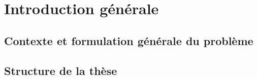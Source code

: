 
\chapter{Introduction g\'en\'erale}

\section{Contexte et formulation g\'en\'erale du probl\`eme}
\section{Structure de la th\`ese}

%
%
